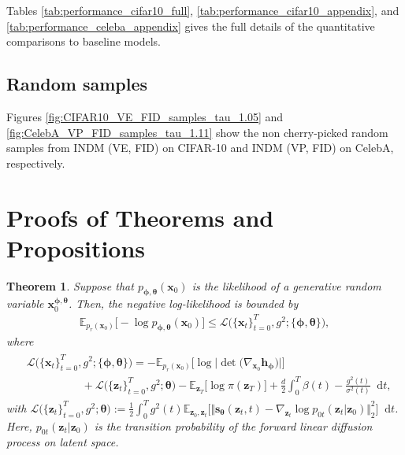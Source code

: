 \documentclass{article}
\newtheorem{theorem}{Theorem}\newtheorem{proposition}{Proposition}
\theoremstyle{definition}
\theoremstyle{remark}
\newcommand*\diff{\mathop{}\!\mathrm{d}}
\begin{document}
	Tables \ref{tab:performance_cifar10_full}, \ref{tab:performance_cifar10_appendix}, and \ref{tab:performance_celeba_appendix} gives the full details of the quantitative comparisons to baseline models.
	
	\subsection{Random samples}\label{appendix:samples}
	
	Figures \ref{fig:CIFAR10_VE_FID_samples_tau_1.05} and \ref{fig:CelebA_VP_FID_samples_tau_1.11} show the non cherry-picked random samples from INDM (VE, FID) on CIFAR-10 and INDM (VP, FID) on CelebA, respectively.
	
	\section{Proofs of Theorems and Propositions}\label{appendix:proofs}
	
	\begingroup
	\renewcommand\thetheorem{1}
	\begin{theorem}\label{thm_app:1}
		Suppose that $p_{\bm{\phi},\bm{\theta}}(\mathbf{x}_{0})$ is the likelihood of a generative random variable $\mathbf{x}_{0}^{\bm{\phi},\bm{\theta}}$. Then, the negative log-likelihood is bounded by
		\begin{align*}
		\mathbb{E}_{p_{r}(\mathbf{x}_{0})}\big[-\log{p_{\bm{\phi},\bm{\theta}}(\mathbf{x}_{0})}\big]\le\mathcal{L}\big(\{\mathbf{x}_{t}\}_{t=0}^{T},g^{2};\{\bm{\phi},\bm{\theta}\}\big),
		\end{align*}
		where
		\begin{align*}
		\begin{split}
		&\mathcal{L}\big(\{\mathbf{x}_{t}\}_{t=0}^{T},g^{2};\{\bm{\phi},\bm{\theta}\}\big)=-\mathbb{E}_{p_{r}(\mathbf{x}_{0})}\big[\log{\big\vert\det\big(\nabla_{\mathbf{x}_{0}}\mathbf{h}_{\bm{\phi}}\big)\big\vert}\big]\\
		&\quad\quad\quad\quad\quad+\mathcal{L}\big(\{\mathbf{z}_{t}\}_{t=0}^{T},g^{2};\bm{\theta}\big)-\mathbb{E}_{\mathbf{z}_{T}}\big[\log{\pi(\mathbf{z}_{T})}\big]+\frac{d}{2}\int_{0}^{T}\beta(t)-\frac{g^{2}(t)}{\sigma^{2}(t)}\diff t,
		\end{split}
		\end{align*}
		with $\mathcal{L}\big(\{\mathbf{z}_{t}\}_{t=0}^{T},g^{2};\bm{\theta}\big):=\frac{1}{2}\int_{0}^{T}g^{2}(t)\mathbb{E}_{\mathbf{z}_{0},\mathbf{z}_{t}}\big[\Vert\mathbf{s}_{\bm{\theta}}(\mathbf{z}_{t},t)-\nabla_{\mathbf{z}_{t}}\log{p_{0t}(\mathbf{z}_{t}\vert\mathbf{z}_{0})}\Vert_{2}^{2}\big]\diff t$. Here, $p_{0t}(\mathbf{z}_{t}\vert\mathbf{z}_{0})$ is the transition probability of the forward linear diffusion process on latent space.
	\end{theorem}
	\endgroup
	
\end{document}
